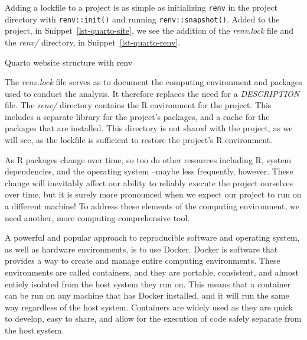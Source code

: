 \documentclass[
  letterpaper,
]{book}
\theoremstyle{definition}
\theoremstyle{remark}
\begin{document}
Adding a lockfile to a project is as simple as initializing
\texttt{renv} in the project directory with \texttt{renv::init()} and
running \texttt{renv::snapshot()}. Added to the project, in
Snippet~\ref{lst-quarto-site}, we see the addition of the
\emph{renv.lock} file and the \emph{renv/} directory, in
Snippet~\ref{lst-quarto-renv}.

\begin{codelisting}

\caption{\label{lst-quarto-renv}Quarto website structure with renv}


\end{codelisting}%

The \emph{renv.lock} file serves as to document the computing
environment and packages used to conduct the analysis. It therefore
replaces the need for a \emph{DESCRIPTION} file. The \emph{renv/}
directory contains the R environment for the project. This includes a
separate library for the project's packages, and a cache for the
packages that are installed. This directory is not shared with the
project, as we will see, as the lockfile is sufficient to restore the
project's R environment.

As R packages change over time, so too do other resources including R,
system dependencies, and the operating system --maybe less frequently,
however. These change will inevitably affect our ability to reliably
execute the project ourselves over time, but it is surely more
pronounced when we expect our project to run on a different machine! To
address these elements of the computing environment, we need another,
more computing-comprehensive tool.

A powerful and popular approach to reproducible software and operating
system, as well as hardware environments, is to use Docker. Docker is
software that provides a way to create and manage entire computing
environments. These environments are called containers, and they are
portable, consistent, and almost entiely isolated from the host system
they run on. This means that a container can be run on any machine that
has Docker installed, and it will run the same way regardless of the
host system. Containers are widely used as they are quick to develop,
easy to share, and allow for the execution of code safely separate from
the host system.
\end{document}
